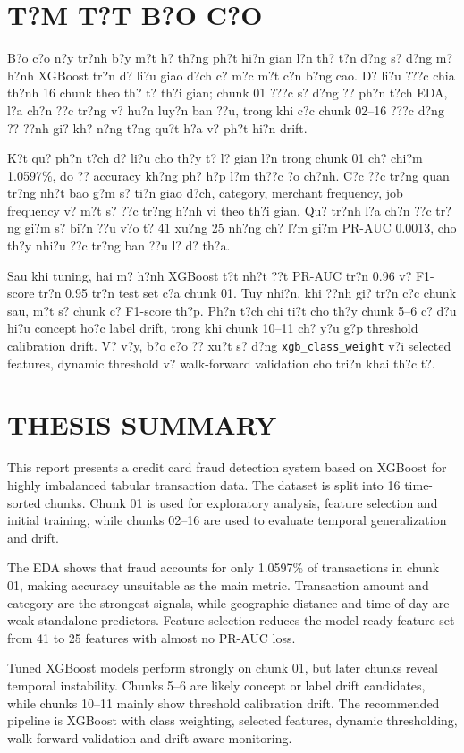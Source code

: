 \section*{T?M T?T B?O C?O}

B?o c?o n?y tr?nh b?y m?t h? th?ng ph?t hi?n gian l?n th? t?n d?ng s? d?ng m? h?nh XGBoost tr?n d? li?u giao d?ch c? m?c m?t c?n b?ng cao. D? li?u ???c chia th?nh 16 chunk theo th? t? th?i gian; chunk 01 ???c s? d?ng ?? ph?n t?ch EDA, l?a ch?n ??c tr?ng v? hu?n luy?n ban ??u, trong khi c?c chunk 02--16 ???c d?ng ?? ??nh gi? kh? n?ng t?ng qu?t h?a v? ph?t hi?n drift.

K?t qu? ph?n t?ch d? li?u cho th?y t? l? gian l?n trong chunk 01 ch? chi?m 1.0597\%, do ?? accuracy kh?ng ph? h?p l?m th??c ?o ch?nh. C?c ??c tr?ng quan tr?ng nh?t bao g?m s? ti?n giao d?ch, category, merchant frequency, job frequency v? m?t s? ??c tr?ng h?nh vi theo th?i gian. Qu? tr?nh l?a ch?n ??c tr?ng gi?m s? bi?n ??u v?o t? 41 xu?ng 25 nh?ng ch? l?m gi?m PR-AUC 0.0013, cho th?y nhi?u ??c tr?ng ban ??u l? d? th?a.

Sau khi tuning, hai m? h?nh XGBoost t?t nh?t ??t PR-AUC tr?n 0.96 v? F1-score tr?n 0.95 tr?n test set c?a chunk 01. Tuy nhi?n, khi ??nh gi? tr?n c?c chunk sau, m?t s? chunk c? F1-score th?p. Ph?n t?ch chi ti?t cho th?y chunk 5--6 c? d?u hi?u concept ho?c label drift, trong khi chunk 10--11 ch? y?u g?p threshold calibration drift. V? v?y, b?o c?o ?? xu?t s? d?ng \texttt{xgb\_class\_weight} v?i selected features, dynamic threshold v? walk-forward validation cho tri?n khai th?c t?.

\newpage

\section*{THESIS SUMMARY}

This report presents a credit card fraud detection system based on XGBoost for highly imbalanced tabular transaction data. The dataset is split into 16 time-sorted chunks. Chunk 01 is used for exploratory analysis, feature selection and initial training, while chunks 02--16 are used to evaluate temporal generalization and drift.

The EDA shows that fraud accounts for only 1.0597\% of transactions in chunk 01, making accuracy unsuitable as the main metric. Transaction amount and category are the strongest signals, while geographic distance and time-of-day are weak standalone predictors. Feature selection reduces the model-ready feature set from 41 to 25 features with almost no PR-AUC loss.

Tuned XGBoost models perform strongly on chunk 01, but later chunks reveal temporal instability. Chunks 5--6 are likely concept or label drift candidates, while chunks 10--11 mainly show threshold calibration drift. The recommended pipeline is XGBoost with class weighting, selected features, dynamic thresholding, walk-forward validation and drift-aware monitoring.
